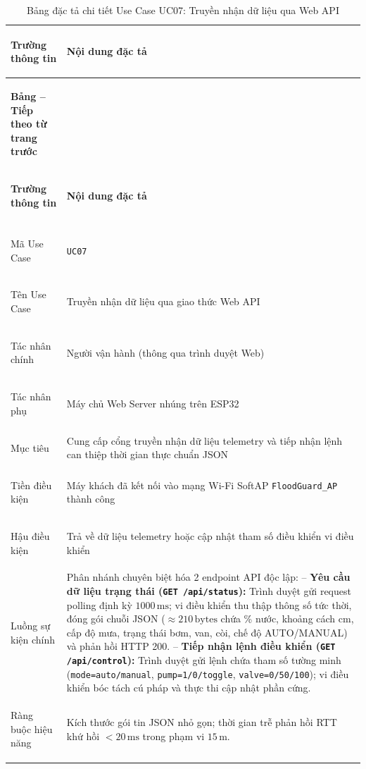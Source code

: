 \begingroup
\small
\renewcommand{\arraystretch}{1.2}
\begin{xltabular}{\textwidth}{|>{\bfseries\raggedright\arraybackslash}p{3.2cm}|X|}
\caption{Bảng đặc tả chi tiết Use Case UC07: Truyền nhận dữ liệu qua Web API} \label{tab:spec_uc07} \\
\hline
\textbf{Trường thông tin} & \textbf{Nội dung đặc tả} \\ \hline
\endfirsthead

{{\bfseries Bảng \thetable{} -- Tiếp theo từ trang trước}} \\
\hline
\textbf{Trường thông tin} & \textbf{Nội dung đặc tả} \\ \hline
\endhead

\hline {} \\ \hline
\endfoot

\hline
\endlastfoot
Mã Use Case & \texttt{UC07} \\ \hline
Tên Use Case & Truyền nhận dữ liệu qua giao thức Web API \\ \hline
Tác nhân chính & Người vận hành (thông qua trình duyệt Web) \\ \hline
Tác nhân phụ & Máy chủ Web Server nhúng trên ESP32 \\ \hline
Mục tiêu & Cung cấp cổng truyền nhận dữ liệu telemetry và tiếp nhận lệnh can thiệp thời gian thực chuẩn JSON \\ \hline
Tiền điều kiện & Máy khách đã kết nối vào mạng Wi-Fi SoftAP \texttt{FloodGuard\_AP} thành công \\ \hline
Hậu điều kiện & Trả về dữ liệu telemetry hoặc cập nhật tham số điều khiển vi điều khiển \\ \hline
Luồng sự kiện chính & 
Phân nhánh chuyên biệt hóa 2 endpoint API độc lập: \newline
-- \textbf{Yêu cầu dữ liệu trạng thái (\texttt{GET /api/status}):} Trình duyệt gửi request polling định kỳ $1000\,\text{ms}$; vi điều khiển thu thập thông số tức thời, đóng gói chuỗi JSON ($\approx 210\,\text{bytes}$ chứa \% nước, khoảng cách cm, cấp độ mưa, trạng thái bơm, van, còi, chế độ AUTO/MANUAL) và phản hồi HTTP 200. \newline
-- \textbf{Tiếp nhận lệnh điều khiển (\texttt{GET /api/control}):} Trình duyệt gửi lệnh chứa tham số tường minh (\texttt{mode=auto/manual}, \texttt{pump=1/0/toggle}, \texttt{valve=0/50/100}); vi điều khiển bóc tách cú pháp và thực thi cập nhật phần cứng. \\ \hline
Ràng buộc hiệu năng & Kích thước gói tin JSON nhỏ gọn; thời gian trễ phản hồi RTT khứ hồi $< 20\,\text{ms}$ trong phạm vi $15\,\text{m}$. \\ \hline

\end{xltabular}
\endgroup


